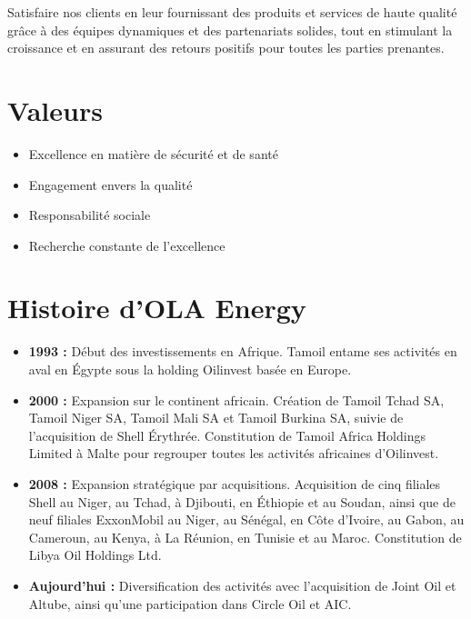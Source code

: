 \documentclass[a4paper, oneside, 12pt, final]{extreport}
\begin{document}
Satisfaire nos clients en leur fournissant des produits et services de haute qualité grâce à des équipes dynamiques et des partenariats solides, tout en stimulant la croissance et en assurant des retours positifs pour toutes les parties prenantes.

\section{Valeurs}
\begin{itemize}


\item Excellence en matière de sécurité et de santé
\item Engagement envers la qualité
\item Responsabilité sociale
\item Recherche constante de l'excellence
\end{itemize}
\section{Histoire d'OLA Energy}
\begin{itemize}
\item \textbf{1993 :} Début des investissements en Afrique. Tamoil entame ses activités en aval en Égypte sous la holding Oilinvest basée en Europe.
\item \textbf{2000 :} Expansion sur le continent africain. Création de Tamoil Tchad SA, Tamoil Niger SA, Tamoil Mali SA et Tamoil Burkina SA, suivie de l'acquisition de Shell Érythrée. Constitution de Tamoil Africa Holdings Limited à Malte pour regrouper toutes les activités africaines d'Oilinvest.
\item \textbf{2008 :} Expansion stratégique par acquisitions. Acquisition de cinq filiales Shell au Niger, au Tchad, à Djibouti, en Éthiopie et au Soudan, ainsi que de neuf filiales ExxonMobil au Niger, au Sénégal, en Côte d'Ivoire, au Gabon, au Cameroun, au Kenya, à La Réunion, en Tunisie et au Maroc. Constitution de Libya Oil Holdings Ltd.
\item \textbf{Aujourd'hui :} Diversification des activités avec l'acquisition de Joint Oil et Altube, ainsi qu'une participation dans Circle Oil et AIC.
\end{itemize}
\end{document}

